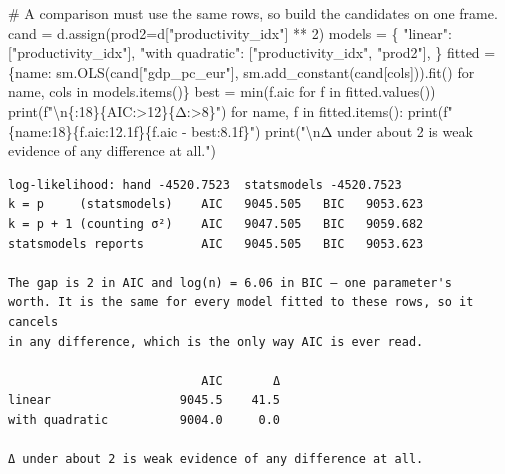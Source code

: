 \documentclass[
  letterpaper,
  10pt,
  twoside,
  openright,
  numbers=noenddot,
  chapterprefix=true]{scrbook}
\newenvironment{Shaded}{}{}
\newcommand{\BuiltInTok}[1]{\textcolor[rgb]{0.84,0.23,0.29}{#1}}
\newcommand{\CharTok}[1]{\textcolor[rgb]{0.01,0.18,0.38}{#1}}
\newcommand{\CommentTok}[1]{\textcolor[rgb]{0.42,0.45,0.49}{#1}}
\newcommand{\ControlFlowTok}[1]{\textcolor[rgb]{0.84,0.23,0.29}{#1}}
\newcommand{\DecValTok}[1]{\textcolor[rgb]{0.00,0.36,0.77}{#1}}
\newcommand{\KeywordTok}[1]{\textcolor[rgb]{0.84,0.23,0.29}{#1}}
\newcommand{\NormalTok}[1]{\textcolor[rgb]{0.14,0.16,0.18}{#1}}
\newcommand{\OperatorTok}[1]{\textcolor[rgb]{0.14,0.16,0.18}{#1}}
\newcommand{\SpecialCharTok}[1]{\textcolor[rgb]{0.00,0.36,0.77}{#1}}
\newcommand{\SpecialStringTok}[1]{\textcolor[rgb]{0.01,0.18,0.38}{#1}}
\newcommand{\StringTok}[1]{\textcolor[rgb]{0.01,0.18,0.38}{#1}}
\begin{document}
\begin{Shaded}
\begin{Highlighting}[]
\CommentTok{\# A comparison must use the same rows, so build the candidates on one frame.}
\NormalTok{cand }\OperatorTok{=}\NormalTok{ d.assign(prod2}\OperatorTok{=}\NormalTok{d[}\StringTok{"productivity\_idx"}\NormalTok{] }\OperatorTok{**} \DecValTok{2}\NormalTok{)}
\NormalTok{models }\OperatorTok{=}\NormalTok{ \{}
    \StringTok{"linear"}\NormalTok{:        [}\StringTok{"productivity\_idx"}\NormalTok{],}
    \StringTok{"with quadratic"}\NormalTok{: [}\StringTok{"productivity\_idx"}\NormalTok{, }\StringTok{"prod2"}\NormalTok{],}
\NormalTok{\}}
\NormalTok{fitted }\OperatorTok{=}\NormalTok{ \{name: sm.OLS(cand[}\StringTok{"gdp\_pc\_eur"}\NormalTok{], sm.add\_constant(cand[cols])).fit()}
          \ControlFlowTok{for}\NormalTok{ name, cols }\KeywordTok{in}\NormalTok{ models.items()\}}
\NormalTok{best }\OperatorTok{=} \BuiltInTok{min}\NormalTok{(f.aic }\ControlFlowTok{for}\NormalTok{ f }\KeywordTok{in}\NormalTok{ fitted.values())}
\BuiltInTok{print}\NormalTok{(}\SpecialStringTok{f"}\CharTok{\textbackslash{}n}\SpecialCharTok{\{}\StringTok{\textquotesingle{}\textquotesingle{}}\SpecialCharTok{:18\}\{}\StringTok{\textquotesingle{}AIC\textquotesingle{}}\SpecialCharTok{:\textgreater{}12\}\{}\StringTok{\textquotesingle{}Δ\textquotesingle{}}\SpecialCharTok{:\textgreater{}8\}}\SpecialStringTok{"}\NormalTok{)}
\ControlFlowTok{for}\NormalTok{ name, f }\KeywordTok{in}\NormalTok{ fitted.items():}
    \BuiltInTok{print}\NormalTok{(}\SpecialStringTok{f"}\SpecialCharTok{\{}\NormalTok{name}\SpecialCharTok{:18\}\{}\NormalTok{f}\SpecialCharTok{.}\NormalTok{aic}\SpecialCharTok{:12.1f\}\{}\NormalTok{f}\SpecialCharTok{.}\NormalTok{aic }\OperatorTok{{-}}\NormalTok{ best}\SpecialCharTok{:8.1f\}}\SpecialStringTok{"}\NormalTok{)}
\BuiltInTok{print}\NormalTok{(}\StringTok{"}\CharTok{\textbackslash{}n}\StringTok{Δ under about 2 is weak evidence of any difference at all."}\NormalTok{)}
\end{Highlighting}
\end{Shaded}

\begin{verbatim}
log-likelihood: hand -4520.7523  statsmodels -4520.7523
k = p     (statsmodels)    AIC   9045.505   BIC   9053.623
k = p + 1 (counting σ²)    AIC   9047.505   BIC   9059.682
statsmodels reports        AIC   9045.505   BIC   9053.623

The gap is 2 in AIC and log(n) = 6.06 in BIC — one parameter's
worth. It is the same for every model fitted to these rows, so it cancels
in any difference, which is the only way AIC is ever read.

                           AIC       Δ
linear                  9045.5    41.5
with quadratic          9004.0     0.0

Δ under about 2 is weak evidence of any difference at all.
\end{verbatim}
\end{document}

